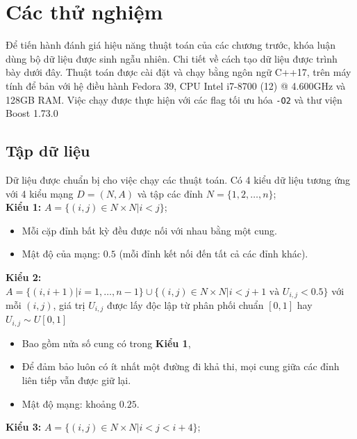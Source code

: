 \documentclass[../main.tex]{subfiles}
\begin{document}
\chapter{Các thử nghiệm}\label{cuxe1c-thux1eed-nghiux1ec7m}

Để tiến hành đánh giá hiệu năng thuật toán của các chương trước, khóa luận dùng bộ dữ liệu được sinh ngẫu nhiên. 
Chi tiết về cách tạo dữ liệu được trình bày dưới đây.
Thuật toán được cài đặt và
chạy bằng ngôn ngữ C++17, trên máy tính để bản với hệ điều hành Fedora
39, CPU Intel i7-8700 (12) @ 4.600GHz và 128GB RAM. Việc chạy được thực hiện
với các flag tối ưu hóa \texttt{-O2} và thư viện Boost 1.73.0



\section{Tập dữ liệu}\label{tux1eadp-dux1eef-liux1ec7u}

Dữ liệu được chuẩn bị cho việc chạy các thuật toán. Có 4 kiểu dữ liệu
tương ứng với 4 kiểu mạng \(D=(N,A)\) và tập các đỉnh
\(N =\{1,2,\dots, n\}\);\\
\textbf{Kiểu 1:} \(A = \{(i, j) \in N \times N | i < j \}\);

  \begin{itemize}
    \tightlist
    \item
      Mỗi cặp đỉnh bất kỳ đều được nối với nhau bằng một cung.
    \item
      Mật độ của mạng: \(0.5\) (mỗi đỉnh kết nối đến tất cả các đỉnh khác).
    \end{itemize}
\textbf{Kiểu 2:}
  \(A = \{(i, i+1) | i = 1, \dots, n-1\} \cup \{(i, j) \in N \times N | i < j + 1 \text{ và } U_{i, j} < 0.5\}\)
  với mỗi \((i, j)\), giá trị \(U_{i, j}\) được lấy độc lập từ phân phối
  chuẩn \([0, 1]\) hay \(U_{i, j} \sim U[0,1]\)

  \begin{itemize}
    \tightlist
    \item
      Bao gồm nửa số cung có trong \textbf{Kiểu 1},
    \item
      Để đảm bảo luôn có ít nhất một đường đi khả thi, mọi cung giữa các
      đỉnh liên tiếp vẫn được giữ lại.
    \item
      Mật độ mạng: khoảng \(0.25\).
    \end{itemize}
\textbf{Kiểu 3:} \(A = \{(i, j) \in N \times N | i < j < i + 4 \}\);
\end{document}
